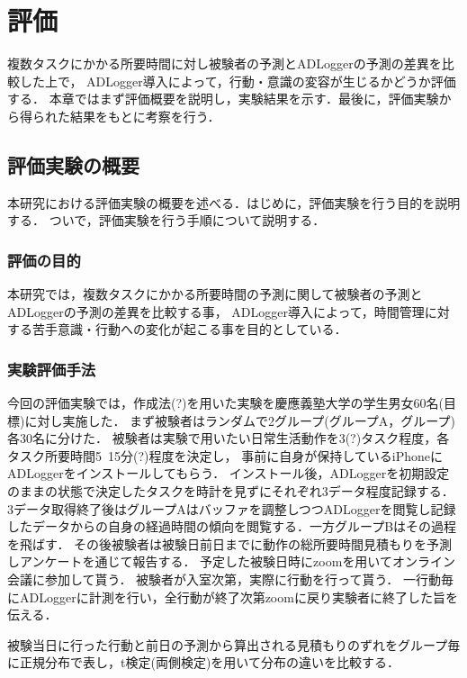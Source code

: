 \chapter{評価}
複数タスクにかかる所要時間に対し被験者の予測とADLoggerの予測の差異を比較した上で，
ADLogger導入によって，行動・意識の変容が生じるかどうか評価する．
本章ではまず評価概要を説明し，実験結果を示す．最後に，評価実験から得られた結果をもとに考察を行う．

\section{評価実験の概要}
本研究における評価実験の概要を述べる．はじめに，評価実験を行う目的を説明する．
ついで，評価実験を行う手順について説明する．

\subsection{評価の目的}
本研究では，複数タスクにかかる所要時間の予測に関して被験者の予測とADLoggerの予測の差異を比較する事，
ADLogger導入によって，時間管理に対する苦手意識・行動への変化が起こる事を目的としている．

\subsection{実験評価手法}
今回の評価実験では，作成法\cite{Oguro1961}\cite{Tayama2018}(?)を用いた実験を慶應義塾大学の学生男女60名(目標)に対し実施した．
まず被験者はランダムで2グループ(グループA，グループ)各30名に分けた．
被験者は実験で用いたい日常生活動作を3(?)タスク程度，各タスク所要時間5~15分(?)程度を決定し，
事前に自身が保持しているiPhoneにADLoggerをインストールしてもらう．
インストール後，ADLoggerを初期設定のままの状態で決定したタスクを時計を見ずにそれぞれ3データ程度記録する．
3データ取得終了後はグループAはバッファを調整しつつADLoggerを閲覧し記録したデータからの自身の経過時間の傾向を閲覧する．一方グループBはその過程を飛ばす．
その後被験者は被験日前日までに動作の総所要時間見積もりを予測しアンケートを通じて報告する．
予定した被験日時にzoom\cite{zoom}を用いてオンライン会議に参加して貰う．
被験者が入室次第，実際に行動を行って貰う．
一行動毎にADLoggerに計測を行い，全行動が終了次第zoomに戻り実験者に終了した旨を伝える．

被験当日に行った行動と前日の予測から算出される見積もりのずれをグループ毎に正規分布で表し，t検定(両側検定)を用いて分布の違いを比較する．

